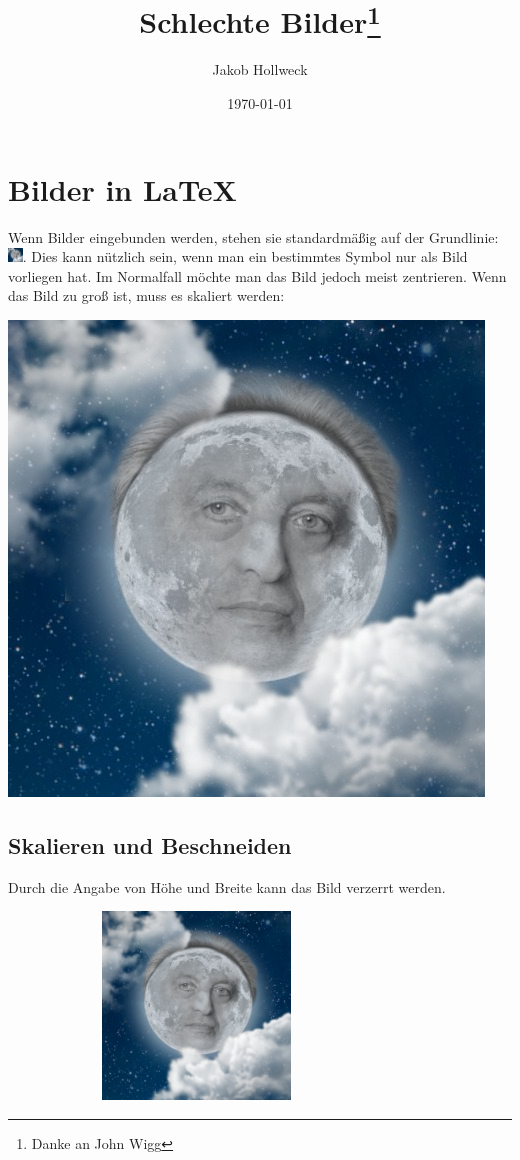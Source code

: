 \documentclass[a4paper, 10pt,onecolumn]{scrartcl}
\title{Schlechte Bilder\thanks{Danke an John Wigg}}
\author{Jakob Hollweck} %
\date{\today}
\begin{document}
\tableofcontents
\maketitle

\section{Bilder in \LaTeX}
Wenn Bilder eingebunden werden, stehen sie standardmäßig auf der Grundlinie: \includegraphics[width=11pt]{lotze.jpg}.
Dies kann nützlich sein, wenn man ein bestimmtes Symbol nur als Bild vorliegen hat. Im Normalfall möchte man das Bild jedoch meist zentrieren. Wenn das Bild zu groß ist, muss es skaliert werden:

\begin{center}
	\includegraphics[scale=0.5]{lotze.jpg}
\end{center}

\newpage

\subsection{Skalieren und Beschneiden}
Durch die Angabe von Höhe und Breite kann das Bild verzerrt werden.

\begin{center}
	\includegraphics[width=10cm, height= 5cm]{lotze.jpg}
\end{center}
\end{document}
